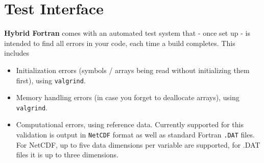 \section{Test Interface} \label{sec:testSystem}
\textbf{Hybrid Fortran} comes with an automated test system that - once set up - is intended to find all errors in your code, each time a build completes. This includes
\begin{itemize}
 \item Initialization errors (symbols / arrays being read without initializing them first), using \verb|valgrind|.
 \item Memory handling errors (in case you forget to deallocate arrays), using \verb|valgrind|.
 \item Computational errors, using reference data. Currently supported for this validation is output in \verb|NetCDF| format as well as standard Fortran \verb|.DAT| files. For NetCDF, up to five data dimensions per variable are supported, for .DAT files it is up to three dimensions.
\end{itemize}

